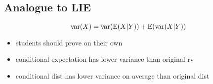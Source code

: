 \subsection{Analogue to LIE}
\[\operatorname{var}(X) = \operatorname{var}(\operatorname{E}(X|Y)) + \operatorname{E}(\operatorname{var}(X|Y))\]
\begin{itemize}
\item students should prove on their own
\item conditional expectation has lower variance than original rv
\item conditional dist has lower variance on average than original
         dist
\end{itemize}
         
